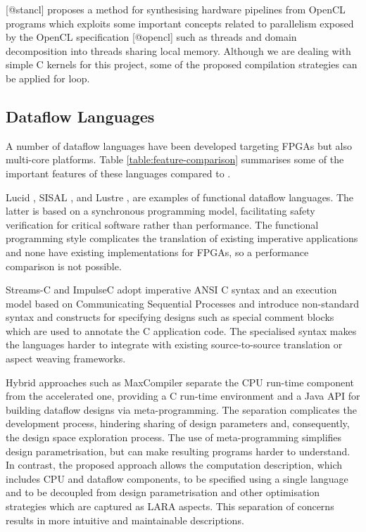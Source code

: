 [@stancl] proposes a method for synthesising hardware pipelines from
OpenCL programs which exploits some important concepts related to
parallelism exposed by the OpenCL specification [@opencl] such as
threads and domain decomposition into threads sharing local memory.
Although we are dealing with simple C kernels for this project, some
of the proposed compilation strategies can be applied for
loop.

\subsection{Dataflow Languages}
A number of dataflow languages have been developed targeting FPGAs but
also multi-core platforms. Table \ref{table:feature-comparison}
summarises some of the important features of these languages compared
to \FAST{}.

Lucid \cite{ashcroft1977lucid}, SISAL \cite{gurd1987implicit},
\cite{mcgraw1983sisal} and Lustre \cite{halbwachs1991synchronous}, are
examples of functional dataflow languages. The latter is based on a
synchronous programming model, facilitating safety verification for
critical software \cite{halbwachs1992programming} rather than
performance. The functional programming style complicates the
translation of existing imperative applications and none have existing
implementations for FPGAs, so a performance comparison is not
possible.

Streams-C\cite{Gokhale:Stone:Arnold:Kalinowski:2000} and
ImpulseC\cite{ImpulseC} adopt imperative ANSI C syntax and an
execution model based on Communicating Sequential Processes and
introduce non-standard syntax and constructs for specifying designs
such as special comment blocks which are used to annotate the C
application code. The specialised syntax makes the languages harder to
integrate with existing source-to-source translation or aspect weaving
frameworks.

Hybrid approaches such as MaxCompiler\cite{5719584} separate the CPU
run-time component from the accelerated one, providing a C run-time
environment and a Java API for building dataflow designs via
meta-programming. The separation complicates the development process,
hindering sharing of design parameters and, consequently, the design
space exploration process. The use of meta-programming simplifies
design parametrisation, but can make resulting programs harder to
understand. In contrast, the proposed approach allows the computation
description, which includes CPU and dataflow components, to be specified
using a single language and to be decoupled from design
parametrisation and other optimisation strategies which are captured
as LARA aspects. This separation of concerns results in more intuitive
and maintainable descriptions.


